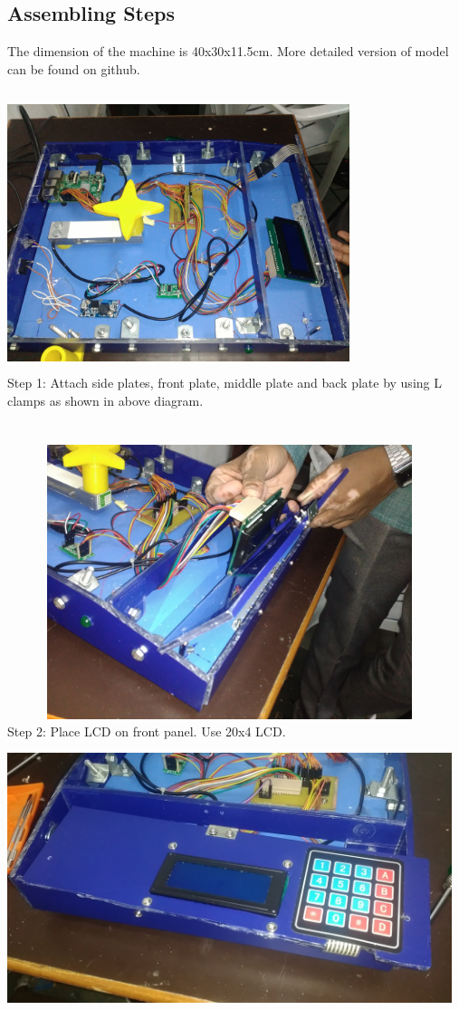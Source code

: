\documentclass[a4paper,12pt,oneside]{book}
\begin{document}
\subsection*{Assembling Steps}
The dimension of the machine is 40x30x11.5cm. More detailed version of model can be found on github.\\\\
\includegraphics[height=8cm,width=10cm]{1.jpg}\\
Step 1: Attach side plates, front plate, middle plate and back plate by using L clamps as shown in above diagram.\\\\\\
\includegraphics[height=8cm,width=13cm]{2.jpg}\\
Step 2: Place LCD on front panel. Use 20x4 LCD.\\
\includegraphics[height=8cm,width=13cm]{3.jpg}\\
\end{document}

